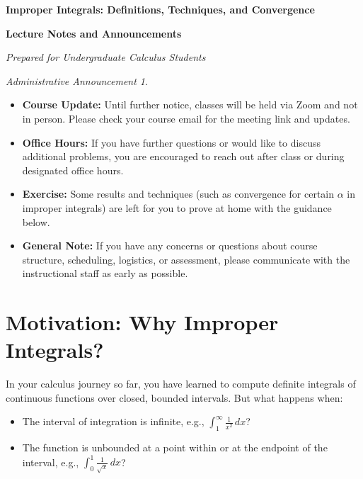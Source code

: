 \documentclass[11pt,oneside]{article}
\theoremstyle{definition}
\theoremstyle{remark}
\newtheorem*{administrative_note}{Administrative Announcement}
\begin{document}
\begin{center}
    {\LARGE \textbf{Improper Integrals: Definitions, Techniques, and Convergence}}

    \vspace{0.5em}

    \textbf{Lecture Notes and Announcements}

    \vspace{0.3em}
    \emph{Prepared for Undergraduate Calculus Students}
\end{center}

\bigskip

\begin{administrative_note}
\vspace{0.8em}
\begin{itemize}[leftmargin=2em]
    \item \textbf{Course Update:} Until further notice, classes will be held via Zoom and not in person. Please check your course email for the meeting link and updates.
    \item \textbf{Office Hours:} If you have further questions or would like to discuss additional problems, you are encouraged to reach out after class or during designated office hours.
    \item \textbf{Exercise:} Some results and techniques (such as convergence for certain $\alpha$ in improper integrals) are left for you to prove at home with the guidance below.
    \item \textbf{General Note:} If you have any concerns or questions about course structure, scheduling, logistics, or assessment, please communicate with the instructional staff as early as possible.
\end{itemize}
\vspace{0.7em}
\end{administrative_note}

\bigskip

\section{Motivation: Why Improper Integrals?}

In your calculus journey so far, you have learned to compute definite integrals of continuous functions over closed, bounded intervals.
But what happens when:
\begin{itemize}
    \item The interval of integration is infinite, e.g., $\int_1^{\infty} \frac{1}{x^2}\,dx$?
    \item The function is unbounded at a point within or at the endpoint of the interval, e.g., $\int_0^1 \frac{1}{\sqrt{x}}\,dx$?
\end{itemize}
\end{document}
